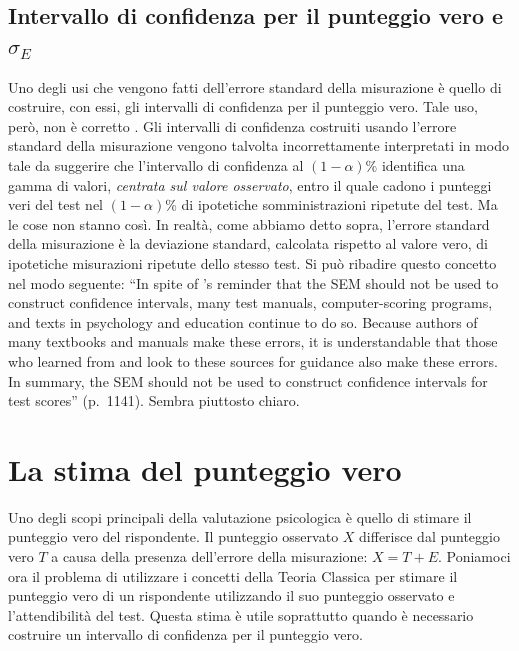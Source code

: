 \documentclass[
  11pt,
]{krantz}
\theoremstyle{definition}
\theoremstyle{definition}
\theoremstyle{definition}
\theoremstyle{definition}
\theoremstyle{remark}
\begin{document}
\hypertarget{intervallo-di-confidenza-per-il-punteggio-vero-e-sigma_e}{%
\section{\texorpdfstring{Intervallo di confidenza per il punteggio vero e \(\sigma_E\)}{Intervallo di confidenza per il punteggio vero e \textbackslash sigma\_E}}\label{intervallo-di-confidenza-per-il-punteggio-vero-e-sigma_e}}

Uno degli usi che vengono fatti dell'errore standard della misurazione è quello di costruire, con essi, gli intervalli di confidenza per il punteggio vero. Tale uso, però, non è corretto \citep{charter1996revisiting}. Gli intervalli di confidenza costruiti usando l'errore standard della misurazione vengono talvolta incorrettamente interpretati in modo tale da suggerire che l'intervallo di confidenza al \((1 - \alpha)\%\) identifica una gamma di valori, \emph{centrata sul valore osservato}, entro il quale cadono i punteggi veri del test nel \((1 - \alpha)\%\) di ipotetiche somministrazioni ripetute del test. Ma le cose non stanno così. In realtà, come abbiamo detto sopra, l'errore standard della misurazione è la deviazione standard, calcolata rispetto al valore vero, di ipotetiche misurazioni ripetute dello stesso test. Si può ribadire questo concetto nel modo seguente: ``In spite of \citet{dudek1979continuing}'s reminder that the SEM should not be used to construct confidence intervals, many test manuals, computer-scoring programs, and texts in psychology and education continue to do so. Because authors of many textbooks and manuals make these errors, it is understandable that those who learned from and look to these sources for guidance also make these errors. In summary, the SEM should not be used to construct confidence intervals for test scores'' (p.~1141). Sembra piuttosto chiaro.

\hypertarget{ch:err_stnd_stima}{%
\chapter{La stima del punteggio vero}\label{ch:err_stnd_stima}}

Uno degli scopi principali della valutazione psicologica è quello di stimare il punteggio vero del rispondente. Il punteggio osservato \(X\) differisce dal punteggio vero \(T\) a causa della presenza dell'errore della misurazione: \(X = T + E\). Poniamoci ora il problema di utilizzare i concetti della Teoria Classica per stimare il punteggio vero di un rispondente utilizzando il suo punteggio osservato e l'attendibilità del test. Questa stima è utile soprattutto quando è necessario costruire un intervallo di confidenza per il punteggio vero.
\end{document}
